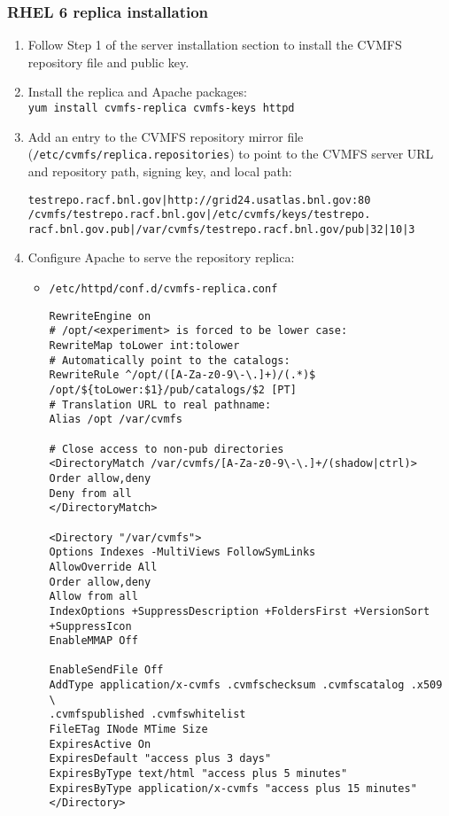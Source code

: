 \documentclass{article}
\begin{document}
\subsubsection{RHEL 6 replica installation}

    
\begin{enumerate}
    \item Follow Step 1 of the server installation section to install the CVMFS repository file and public key.

    \item Install the replica and Apache packages: \\
    \verb+yum install cvmfs-replica cvmfs-keys httpd+ 

    \item Add an entry to the CVMFS repository mirror file
    (\verb+/etc/cvmfs/replica.repositories+) 
    to point to the CVMFS server URL and repository path, signing key, and local path:
    \begin{verbatim}
testrepo.racf.bnl.gov|http://grid24.usatlas.bnl.gov:80
/cvmfs/testrepo.racf.bnl.gov|/etc/cvmfs/keys/testrepo.
racf.bnl.gov.pub|/var/cvmfs/testrepo.racf.bnl.gov/pub|32|10|3
    \end{verbatim}

    \item Configure Apache to serve the repository replica:\\
        \begin{itemize} 
            \item \verb+/etc/httpd/conf.d/cvmfs-replica.conf+ 
            \begin{verbatim}
RewriteEngine on
# /opt/<experiment> is forced to be lower case:
RewriteMap toLower int:tolower
# Automatically point to the catalogs:
RewriteRule ^/opt/([A-Za-z0-9\-\.]+)/(.*)$
/opt/${toLower:$1}/pub/catalogs/$2 [PT]
# Translation URL to real pathname:
Alias /opt /var/cvmfs

# Close access to non-pub directories
<DirectoryMatch /var/cvmfs/[A-Za-z0-9\-\.]+/(shadow|ctrl)>
Order allow,deny
Deny from all
</DirectoryMatch>

<Directory "/var/cvmfs">
Options Indexes -MultiViews FollowSymLinks
AllowOverride All
Order allow,deny
Allow from all
IndexOptions +SuppressDescription +FoldersFirst +VersionSort
+SuppressIcon
EnableMMAP Off

EnableSendFile Off
AddType application/x-cvmfs .cvmfschecksum .cvmfscatalog .x509 \
.cvmfspublished .cvmfswhitelist
FileETag INode MTime Size
ExpiresActive On
ExpiresDefault "access plus 3 days"
ExpiresByType text/html "access plus 5 minutes"
ExpiresByType application/x-cvmfs "access plus 15 minutes"
</Directory>
                    \end{verbatim}
        \end{itemize} 


\end{enumerate}
\end{document}

